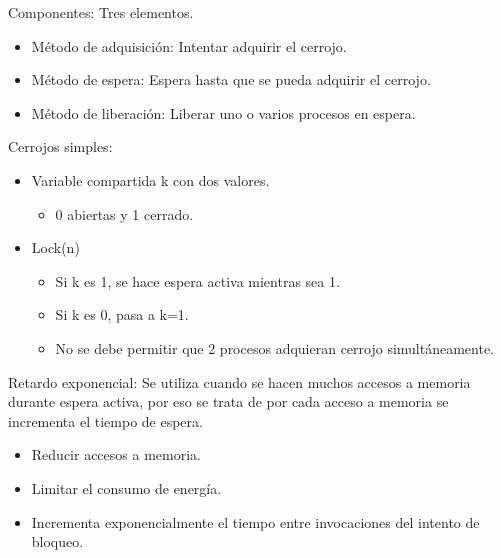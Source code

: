 \documentclass[12pt, twoside, openright]{report} %
\begin{document}
    Componentes: Tres elementos.

    \begin{itemize}
    
    \item
      Método de adquisición: Intentar adquirir el cerrojo.
    \item
      Método de espera: Espera hasta que se pueda adquirir el cerrojo.
    \item
      Método de liberación: Liberar uno o varios procesos en espera.
    \end{itemize}
\pagebreak
    Cerrojos simples:

    \begin{itemize}
    
    \item
      Variable compartida k con dos valores.

      \begin{itemize}
      
      \item
        0 abiertas y 1 cerrado.
      \end{itemize}
    \item
      Lock(n)

      \begin{itemize}
      
      \item
        Si k es 1, se hace espera activa mientras sea 1.
      \item
        Si k es 0, pasa a k=1.
      \item
        No se debe permitir que 2 procesos adquieran cerrojo
        simultáneamente.
      \end{itemize}
    \end{itemize}

    Retardo exponencial: Se utiliza cuando se hacen muchos accesos a
    memoria durante espera activa, por eso se trata de por cada acceso
    a memoria se incrementa el tiempo de espera.

    \begin{itemize}
    
    \item
      Reducir accesos a memoria.
    \item
      Limitar el consumo de energía.
    \item
      Incrementa exponencialmente el tiempo entre invocaciones del
      intento de bloqueo.
    \end{itemize}
\end{document}
